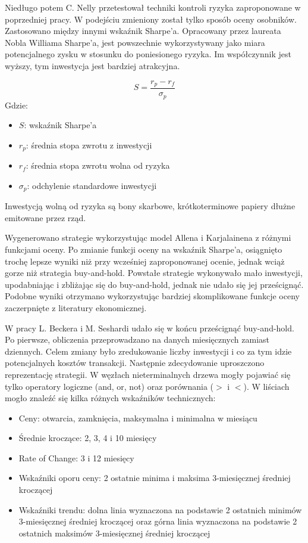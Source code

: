 \documentclass[twoside]{iisthesis}
\begin{document}
Niedługo potem C. Nelly \cite{Neely200369} przetestował techniki kontroli ryzyka zaproponowane w poprzedniej pracy. W podejściu zmieniony został tylko sposób oceny osobników. Zastosowano między innymi wskaźnik Sharpe'a. Opracowany przez laureata Nobla Williama Sharpe'a, jest powszechnie wykorzystywany jako miara potencjalnego zysku w stosunku do poniesionego ryzyka. Im współczynnik jest wyższy, tym inwestycja jest bardziej atrakcyjna.

\[S=\frac{r_{p} - r_{f}}{\sigma_{p}}\]
Gdzie:
\begin{itemize}[label=]
	\item $S$: wskaźnik Sharpe'a
	\item $r_p$: średnia stopa zwrotu z inwestycji
	\item $r_f$: średnia stopa zwrotu wolna od ryzyka
	\item $\sigma_p$: odchylenie standardowe inwestycji
\end{itemize}

Inwestycją wolną od ryzyka są bony skarbowe, krótkoterminowe papiery dłużne emitowane przez rząd.

Wygenerowano strategie wykorzystując model Allena i Karjalainena z różnymi funkcjami oceny. Po zmianie funkcji oceny na wskaźnik Sharpe'a, osiągnięto trochę lepsze wyniki niż przy wcześniej zaproponowanej ocenie, jednak wciąż gorze niż strategia buy-and-hold. Powstałe strategie wykonywało mało inwestycji, upodabniając i zbliżając się do buy-and-hold, jednak nie udało się jej prześcignąć. Podobne wyniki otrzymano wykorzystując bardziej skomplikowane funkcje oceny zaczerpnięte z literatury ekonomicznej.

W pracy L. Beckera i M. Seshardi \cite{Becker:2003} udało się w końcu prześcignąć buy-and-hold. Po pierwsze, obliczenia przeprowadzano na danych miesięcznych zamiast dziennych. Celem zmiany było zredukowanie liczby inwestycji i co za tym idzie potencjalnych kosztów transakcji. Następnie zdecydowanie uproszczono reprezentację strategii. W węzłach nieterminalnych drzewa mogły pojawiać się tylko operatory logiczne (and, or, not) oraz porównania ($>$ i $<$).  W liściach mogło znaleźć się kilka różnych wskaźników technicznych:

\begin{itemize}
	\item Ceny: otwarcia, zamknięcia, maksymalna i minimalna w miesiącu
	\item Średnie kroczące: 2, 3, 4 i 10 miesięcy
	\item Rate of Change: 3 i 12 miesięcy
	\item Wskaźniki oporu ceny: 2 ostatnie minima i maksima 3-miesięcznej średniej kroczącej
	\item Wskaźniki trendu: dolna linia wyznaczona na podstawie 2 ostatnich minimów 3-miesięcznej średniej kroczącej oraz górna linia wyznaczona na podstawie 2 ostatnich maksimów 3-miesięcznej średniej kroczącej
\end{itemize}
\end{document}
